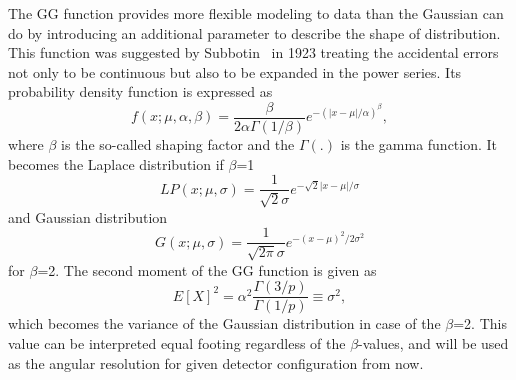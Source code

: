 \documentclass[jkps,preprint,fleqn,showpacs,showkeys]{revtex4}
\begin{document}
The GG function provides more flexible modeling to data than the Gaussian can do by introducing an additional parameter to describe the shape of distribution. This function was suggested by Subbotin~\cite{Subbotin} in 1923 treating the accidental errors not only to be continuous but also to be expanded in the power series. Its probability density function is expressed as 
\begin{equation}    
     f(x; \mu, \alpha, \beta) = \frac{\beta}{2 \alpha \Gamma(1/\beta)} e^{-(|x-\mu|/\alpha)^\beta} , 
\end{equation}    
where $\beta$ is the so-called shaping factor
and the $\Gamma(.)$ is the gamma function.
It becomes the Laplace distribution if $\beta$=1 
\begin{equation}
LP(x;\mu, \sigma) = \frac{1}{\sqrt{2}\sigma} e^{-{\sqrt{2}{|x-\mu|} / \sigma}} 
\end{equation}
and Gaussian distribution
\begin{equation}
G(x;\mu, \sigma) = \frac{1}{\sqrt{2 \pi} \sigma} e^{-(x-\mu)^2/2\sigma^2} 
\end{equation}
for $\beta$=2.  The second moment of the GG function is given as
\begin{equation}    
    E[X]^2  = \alpha^2 \frac{\Gamma(3/p)}{\Gamma(1/p)}  \equiv \sigma^2 , 
\end{equation}
which becomes the variance of the Gaussian distribution in case of the $\beta$=2. This value can be interpreted equal footing regardless of the $\beta$-values, and will be used as the angular resolution for given detector configuration from now.
\end{document}
